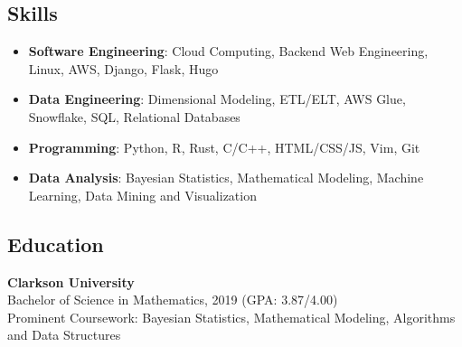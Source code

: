 \documentclass[10pt]{article}
\begin{document}
\subsection*{Skills}
\begin{itemize}
	\setlength{\itemsep}{1pt}
	\setlength{\parskip}{0pt}
	\setlength{\parsep}{0pt}
	\item \textbf{Software Engineering}: Cloud Computing, Backend Web Engineering, Linux, AWS, Django, Flask, Hugo
	\item \textbf{Data Engineering}: Dimensional Modeling, ETL/ELT, AWS Glue, Snowflake, SQL, Relational Databases
	\item \textbf{Programming}: Python, R, Rust, C/C++, HTML/CSS/JS, Vim, Git
	\item \textbf{Data Analysis}: Bayesian Statistics, Mathematical Modeling, Machine Learning, Data Mining and Visualization
\end{itemize}

\subsection*{Education}
\textbf{Clarkson University} \\
Bachelor of Science in Mathematics, 2019 (GPA: 3.87/4.00)\\
Prominent Coursework: Bayesian Statistics, Mathematical Modeling, Algorithms and Data Structures
\end{document}
